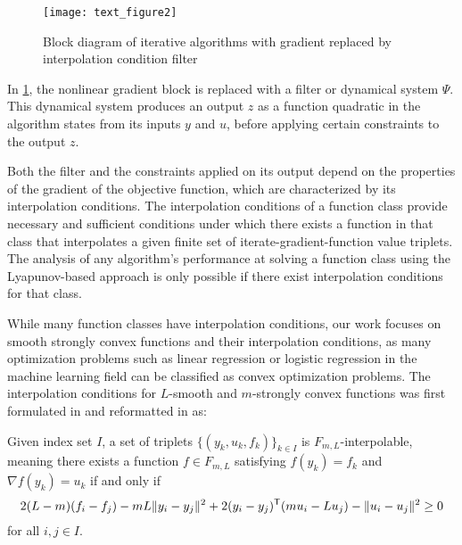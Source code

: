 \begin{figure}[h]
    \centering
	\texttt{[image: text\_figure2]}
    \caption{Block diagram of iterative algorithms with gradient replaced by interpolation condition filter}
    \label{plot_block_diagram2}
\end{figure}

In \cref{plot_block_diagram2}, the nonlinear gradient block is replaced with a filter or dynamical system $\Psi$. This dynamical system produces an output $z$ as a function quadratic in the algorithm states from its inputs $y$ and $u$, before applying certain constraints to the output $z$. 

Both the filter and the constraints applied on its output depend on the properties of the gradient of the objective function, which are characterized by its interpolation conditions. The interpolation conditions of a function class provide necessary and sufficient conditions under which there exists a function in that class that interpolates a given finite set of iterate-gradient-function value triplets. The analysis of any algorithm's performance at solving a function class using the Lyapunov-based approach is only possible if there exist interpolation conditions for that class.

While many function classes have interpolation conditions, our work focuses on smooth strongly convex functions and their interpolation conditions, as many optimization problems such as linear regression or logistic regression in the machine learning field can be classified as convex optimization problems. The interpolation conditions for $L$-smooth and $m$-strongly convex functions was first formulated in \cite{taylor2016} and reformatted in \cite{tutorial} as:

\begin{theorem}
	\label{thm:interpolation_condition}
	Given index set \(I\), a set of triplets \(\{(y_k, u_k, f_k)\}_{k \in I}\) is $F_{m,L}$-interpolable, meaning there exists a function \(f \in F_{m,L}\) satisfying \(f(y_k) = f_k\) and \(\nabla f(y_k) = u_k\) if and only if
	\[
	 	2(L-m)(f_i - f_j) - mL\|y_i - y_j\|^2 + 2(y_i - y_j)^{\mathsf{T}} (mu_i - Lu_j) - \|u_i - u_j\|^2 \geq 0
	\]
	for all $i,j\in I$.
\end{theorem}

